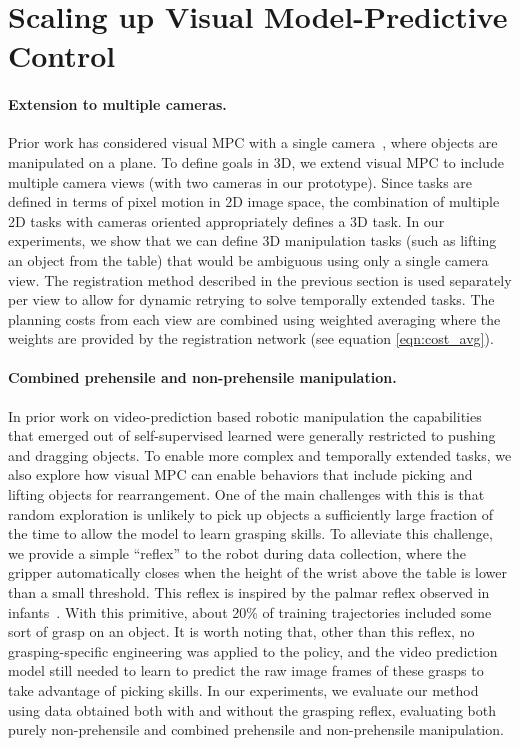 \section{Scaling up Visual Model-Predictive Control}
\paragraph{Extension to multiple cameras.}
Prior work has considered visual MPC with a single camera~\cite{foresight,sna}, where objects are manipulated on a plane. To define goals in 3D, we extend visual MPC to include multiple camera views (with two cameras in our prototype). Since tasks are defined in terms of pixel motion in 2D image space, the combination of multiple 2D tasks with cameras oriented appropriately defines a 3D task. In our experiments, we show that we can define 3D manipulation tasks (such as lifting an object from the table) that would be ambiguous using only a single camera view. The registration method described in the previous section is used separately per view to allow for dynamic retrying to solve temporally extended tasks. The planning costs from each view are combined using weighted averaging where the weights are provided by the registration network (see equation \ref{eqn:cost_avg}). 

\vspace{-0.1in}
\paragraph{Combined prehensile and non-prehensile manipulation.}
In prior work on video-prediction based robotic manipulation \cite{sna, foresight} the capabilities that emerged out of self-supervised learned were generally restricted to pushing and dragging objects. To enable more complex and temporally extended tasks, we also explore how visual MPC can enable behaviors that include picking and lifting objects for rearrangement. One of the main challenges with this is that random exploration is unlikely to pick up objects a sufficiently large fraction of the time to allow the model to learn grasping skills. To alleviate this challenge, we provide a simple ``reflex'' to the robot during data collection, where the gripper automatically closes when the height of the wrist above the table is lower than a small threshold. This reflex is inspired by the palmar reflex observed in infants~\cite{grasping_fetal}. With this primitive, about 20\% of training trajectories included some sort of grasp on an object. It is worth noting that, other than this reflex, no grasping-specific engineering was applied to the policy, and the video prediction model still needed to learn to predict the raw image frames of these grasps to take advantage of picking skills. In our experiments, we evaluate our method using data obtained both with and without the grasping reflex, evaluating both purely non-prehensile and combined prehensile and non-prehensile manipulation.

